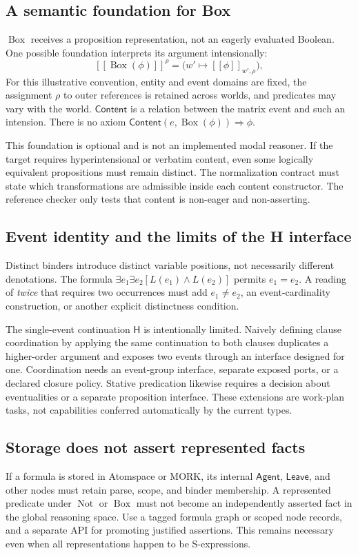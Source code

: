 \documentclass[11pt,a4paper]{article}
\newcommand{\HH}{\mathsf{H}}
\newcommand{\Bx}{\operatorname{Box}}
\newcommand{\Not}{\operatorname{Not}}
\newcommand{\sem}[1]{\left[\!\left[#1\right]\!\right]}
\begin{document}
\subsection{A semantic foundation for Box}
\(\Bx\) receives a proposition representation, not an eagerly evaluated
Boolean. One possible foundation interprets its argument intensionally:
\[
  \sem{\Bx(\phi)}^\rho
     =\bigl(w'\mapsto\sem{\phi}_{w',\rho}\bigr),
\]
For this illustrative convention, entity and event domains are fixed, the
assignment \(\rho\) to outer references is retained across worlds, and
predicates may vary with the world. \(\mathsf{Content}\) is a relation between the matrix
event and such an intension. There is no axiom
\(\mathsf{Content}(e,\Bx(\phi))\Rightarrow\phi\).

This foundation is optional and is not an implemented modal reasoner.
If the target requires hyperintensional or verbatim content, even some
logically equivalent propositions must remain distinct. The normalization
contract must state which transformations are admissible inside each
content constructor. The reference checker only tests that content is
non-eager and non-asserting.

\subsection{Event identity and the limits of the H interface}
Distinct binders introduce distinct variable positions, not necessarily
different denotations. The formula
\(\exists e_1\exists e_2[L(e_1)\land L(e_2)]\) permits \(e_1=e_2\).
A reading of \emph{twice} that requires two occurrences must add
\(e_1\ne e_2\), an event-cardinality construction, or another explicit
distinctness condition.

The single-event continuation \(\HH\) is intentionally limited. Naively
defining clause coordination by applying the same continuation to both clauses
duplicates a higher-order argument and exposes two events through an
interface designed for one. Coordination needs an event-group interface,
separate exposed ports, or a declared closure policy. Stative predication
likewise requires a decision about eventualities or a separate proposition
interface. These extensions are work-plan tasks, not capabilities conferred
automatically by the current types.

\subsection{Storage does not assert represented facts}
If a formula is stored in Atomspace or MORK, its internal
\(\mathsf{Agent}\), \(\mathsf{Leave}\), and other nodes must retain parse,
scope, and binder membership. A represented predicate under \(\Not\) or
\(\Bx\) must not become an independently asserted fact in the global
reasoning space. Use a tagged formula graph or scoped node records, and a
separate API for promoting justified assertions. This remains necessary even
when all representations happen to be S-expressions.
\end{document}
